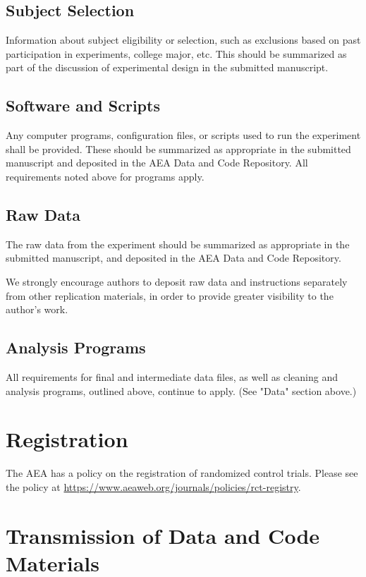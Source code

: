 \documentclass[PP]{AEA}
\begin{document}
\subsection{Subject Selection}

Information about subject eligibility or selection,  such as exclusions based on past participation in experiments, college major, etc. This should be summarized as part of the discussion of experimental design in the submitted manuscript.

\subsection{Software and Scripts}

Any computer programs, configuration files, or scripts used  to run the experiment shall be provided. These should be summarized as appropriate in the submitted manuscript and deposited in the AEA Data and Code Repository. All requirements noted above for programs apply.

\subsection{Raw Data}

The raw data from the experiment should be summarized as appropriate in the submitted manuscript, and deposited in the AEA Data and Code Repository. 

We strongly encourage authors to deposit raw data and instructions separately from other replication materials, in order to provide greater visibility to the author’s work.

\subsection{Analysis Programs}

All requirements for final and intermediate data files, as well as cleaning and analysis programs, outlined above, continue to apply. (See "Data" section above.)

\section{Registration}

The AEA has a policy on the registration of randomized control trials. Please see the policy at \url{https://www.aeaweb.org/journals/policies/rct-registry}.

\section{Transmission of Data and Code Materials}
\end{document}
